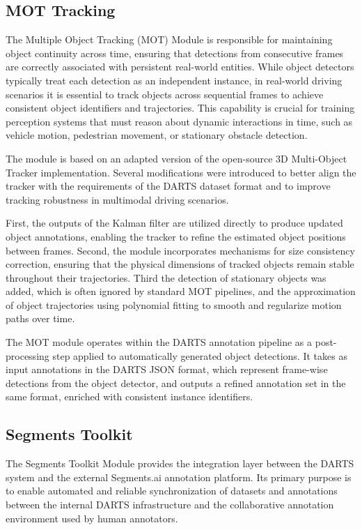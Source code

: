 \documentclass[conference]{IEEEtran}
\begin{document}
\subsection{MOT Tracking}

The Multiple Object Tracking (MOT) Module is responsible for maintaining object continuity across time, ensuring that detections from consecutive frames are correctly associated with persistent real-world entities. While object detectors typically treat each detection as an independent instance, in real-world driving scenarios it is essential to track objects across sequential frames to achieve consistent object identifiers and trajectories. This capability is crucial for training perception systems that must reason about dynamic interactions in time, such as vehicle motion, pedestrian movement, or stationary obstacle detection.

The module is based on an adapted version of the open-source 3D Multi-Object Tracker implementation\cite{mot}. Several modifications were introduced to better align the tracker with the requirements of the DARTS dataset format and to improve tracking robustness in multimodal driving scenarios.

First, the outputs of the Kalman filter are utilized directly to produce updated object annotations, enabling the tracker to refine the estimated object positions between frames. Second, the module incorporates mechanisms for size consistency correction, ensuring that the physical dimensions of tracked objects remain stable throughout their trajectories. Third the detection of stationary objects was added, which is often ignored by standard MOT pipelines, and the approximation of object trajectories using polynomial fitting to smooth and regularize motion paths over time.

The MOT module operates within the DARTS annotation pipeline as a post-processing step applied to automatically generated object detections. It takes as input annotations in the DARTS JSON format, which represent frame-wise detections from the object detector, and outputs a refined annotation set in the same format, enriched with consistent instance identifiers.


\subsection{Segments Toolkit}

The Segments Toolkit Module provides the integration layer between the DARTS system and the external Segments.ai annotation platform. Its primary purpose is to enable automated and reliable synchronization of datasets and annotations between the internal DARTS infrastructure and the collaborative annotation environment used by human annotators.
\end{document}
